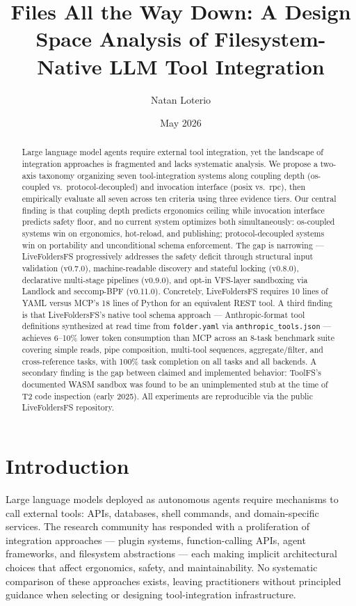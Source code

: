 \documentclass[
  11pt,
]{article}
\title{Files All the Way Down: A Design Space Analysis of
Filesystem-Native LLM Tool Integration}
\author{Natan Loterio}
\date{May 2026}
\begin{document}
\maketitle
\begin{abstract}
Large language model agents require external tool integration, yet the
landscape of integration approaches is fragmented and lacks systematic
analysis. We propose a two-axis taxonomy organizing seven
tool-integration systems along coupling depth (os-coupled
vs.~protocol-decoupled) and invocation interface (posix vs.~rpc), then
empirically evaluate all seven across ten criteria using three evidence
tiers. Our central finding is that coupling depth predicts ergonomics
ceiling while invocation interface predicts safety floor, and no current
system optimizes both simultaneously: os-coupled systems win on
ergonomics, hot-reload, and publishing; protocol-decoupled systems win
on portability and unconditional schema enforcement. The gap is
narrowing --- LiveFoldersFS progressively addresses the safety deficit
through structural input validation (v0.7.0), machine-readable discovery
and stateful locking (v0.8.0), declarative multi-stage pipelines
(v0.9.0), and opt-in VFS-layer sandboxing via Landlock and seccomp-BPF
(v0.11.0). Concretely, LiveFoldersFS requires 10 lines of YAML versus
MCP's 18 lines of Python for an equivalent REST tool. A third finding is
that LiveFoldersFS's native tool schema approach --- Anthropic-format
tool definitions synthesized at read time from \texttt{folder.yaml} via
\texttt{anthropic\_tools.json} --- achieves 6--10\% lower token
consumption than MCP across an 8-task benchmark suite covering simple
reads, pipe composition, multi-tool sequences, aggregate/filter, and
cross-reference tasks, with 100\% task completion on all tasks and all
backends. A secondary finding is the gap between claimed and implemented
behavior: ToolFS's documented WASM sandbox was found to be an
unimplemented stub at the time of T2 code inspection (early 2025). All
experiments are reproducible via the public LiveFoldersFS repository.
\end{abstract}

\hypertarget{introduction}{%
\section{Introduction}\label{introduction}}

Large language models deployed as autonomous agents require mechanisms
to call external tools: APIs, databases, shell commands, and
domain-specific services. The research community has responded with a
proliferation of integration approaches --- plugin systems,
function-calling APIs, agent frameworks, and filesystem abstractions ---
each making implicit architectural choices that affect ergonomics,
safety, and maintainability. No systematic comparison of these
approaches exists, leaving practitioners without principled guidance
when selecting or designing tool-integration infrastructure.
\end{document}
